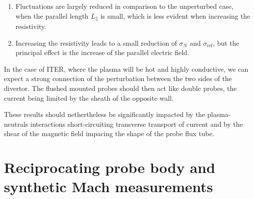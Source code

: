 \documentclass[cpp,a4paper,fleqn,twoside%
]{w-art}
\begin{document}
\begin{enumerate}
\item Fluctuations are largely reduced in comparison to the unperturbed 
case, when the parallel length $L_\parallel$ is small, which is less 
evident when increasing the resistivity.
\item  Increasing the resistivity leads to a small reduction of $\sigma_N$ 
and $\sigma_\text{ref}$, but the principal effect is the increase of 
the parallel electric field.
\end{enumerate}

In the case of ITER, where the plasma will be hot and highly 
conductive, we can expect a strong connection of the perturbation 
between the two sides of the divertor. The flushed mounted probes 
should then act like double probes, the current being limited by the 
sheath of the opposite wall.

These results should nethertheless be significantly impacted by the 
plasma-neutrals interactions short-circuiting transverse 
transport of current and by the shear of the magnetic field impacing the shape of the probe flux tube.

\section{Reciprocating probe body and synthetic Mach measurements}
\end{document}
